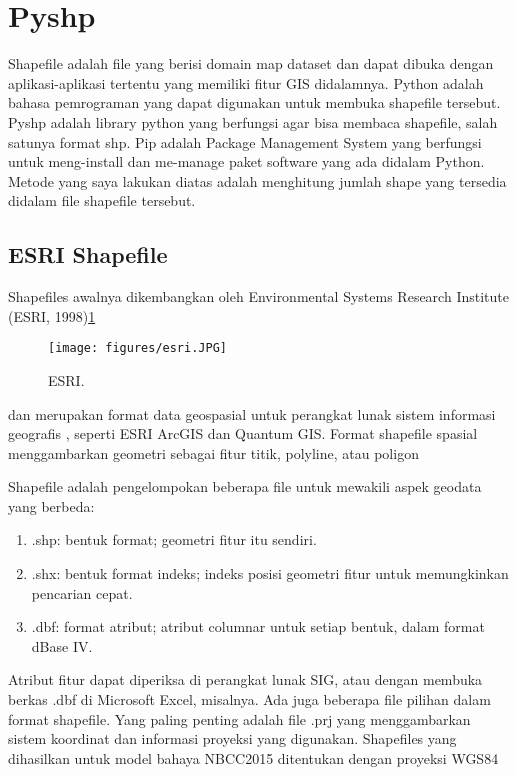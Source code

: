
\section{Pyshp}
Shapefile adalah file yang berisi domain map dataset dan dapat dibuka dengan aplikasi-aplikasi tertentu yang memiliki fitur GIS didalamnya.
Python adalah bahasa pemrograman yang dapat digunakan untuk membuka shapefile tersebut.
Pyshp adalah library python yang berfungsi agar bisa membaca shapefile, salah satunya format shp.
Pip adalah Package Management System yang berfungsi untuk meng-install dan me-manage paket software yang ada didalam Python.
Metode yang saya lakukan diatas adalah menghitung jumlah shape yang tersedia didalam file shapefile tersebut.

\subsection{ESRI Shapefile}
	
Shapefiles awalnya dikembangkan oleh Environmental Systems Research Institute (ESRI, 1998)\ref{esri}
	\begin{figure}[ht]
	\centerline{\texttt{[image: figures/esri.JPG]}}
	\caption{ESRI.}
	\label{esri}
	\end{figure}
	dan merupakan format data geospasial untuk perangkat lunak sistem informasi geografis , seperti ESRI ArcGIS dan Quantum GIS.
	Format shapefile spasial menggambarkan geometri sebagai fitur titik, polyline, atau poligon

Shapefile adalah pengelompokan beberapa file untuk mewakili aspek geodata yang berbeda:
\begin{enumerate}
	\item .shp: bentuk format; geometri fitur itu sendiri.
	\item .shx: bentuk format indeks; indeks posisi geometri fitur untuk memungkinkan pencarian cepat.
	\item .dbf: format atribut; atribut columnar untuk setiap bentuk, dalam format dBase IV.
\end{enumerate}
Atribut fitur dapat diperiksa di perangkat lunak SIG, atau dengan membuka berkas .dbf di Microsoft Excel, misalnya. Ada juga beberapa file pilihan dalam format shapefile. Yang paling penting adalah file .prj yang menggambarkan sistem koordinat dan informasi proyeksi yang digunakan. Shapefiles yang dihasilkan untuk model bahaya NBCC2015 ditentukan dengan proyeksi WGS84

